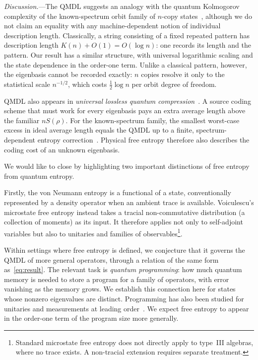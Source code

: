 \documentclass[aps,prl,twocolumn,superscriptaddress,amsmath,amssymb,reprint,longbibliography]{revtex4-2}
\begin{document}
\emph{Discussion.}---The QMDL suggests an analogy with the quantum Kolmogorov complexity of the known-spectrum orbit family of $n$-copy states~\cite{mueller2007,Berthiaume_2001,G_cs_2001}, although we do not claim an equality with any machine-dependent notion of individual description length. Classically, a string consisting of a fixed repeated pattern has description length $K(n)+O(1)=O(\log n)$: one records its length and the pattern. Our result has a similar structure, with universal logarithmic scaling and the state dependence in the order-one term. Unlike a classical pattern, however, the eigenbasis cannot be recorded exactly: $n$ copies resolve it only to the statistical scale $n^{-1/2}$, which costs $\frac12\log n$ per orbit degree of freedom.

QMDL also appears in \emph{universal lossless quantum compression}~\cite{hayashi2010universal,clarke1990information}. A source coding scheme that must work for every eigenbasis pays an extra average length above the familiar $nS(\rho)$. For the known-spectrum family, the smallest worst-case excess in ideal average length equals the QMDL up to a finite, spectrum-dependent entropy correction~\cite{paper2}. Physical free entropy therefore also describes the coding cost of an unknown eigenbasis. 

We would like to close by highlighting two important distinctions of free entropy from quantum entropy. 

Firstly, the von Neumann entropy is a functional of a state, conventionally represented by a density operator when an ambient trace is available. Voiculescu's microstate free entropy instead takes a tracial non-commutative distribution (a collection of moments) as its input. It therefore applies not only to self-adjoint variables but also to unitaries and families of observables\footnote{Standard microstate free entropy does not directly apply to type~III algebras, where no trace exists. A non-tracial extension requires separate treatment.}.

Within settings where free entropy is defined, we conjecture that it governs the QMDL of more general operators, through a relation of the same form as~\eqref{eq:result}. The relevant task is \emph{quantum programming}: how much quantum memory is needed to store a program for a family of operators, with error vanishing as the memory grows. We establish this connection here for states whose nonzero eigenvalues are distinct. Programming has also been studied for unitaries and measurements at leading order~\cite{Kubicki_2019,yang2020optimal,DAriano_2005,PrezGarca_2006}. We expect free entropy to appear in the order-one term of the program size more generally.
\end{document}
